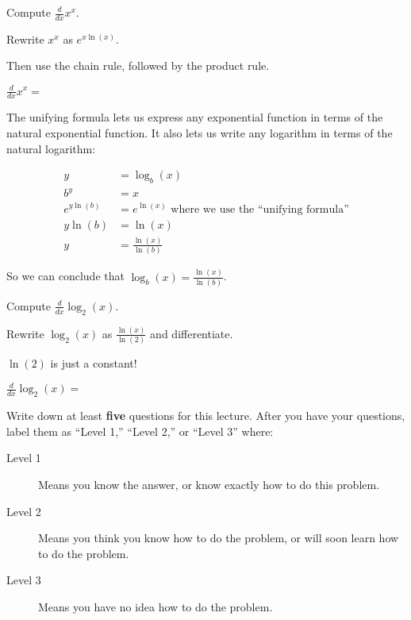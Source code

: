 \documentclass{ximera}
\begin{document}
\begin{question}
  Compute $\frac{d}{dx} x^x$.
  
  \begin{hint}
    Rewrite $x^x$ as $e^{x\ln(x)}$.
  \end{hint}
  \begin{hint}
    Then use the chain rule, followed by the product rule.
  \end{hint}
  $\frac{d}{dx} x^x = $ 
\end{question}

The unifying formula lets us express any exponential function in terms of the natural exponential function.  It also lets us write any logarithm in terms of the natural logarithm:

\begin{align*}
	y &= \log_b(x)\\
	b^y &=  x\\
	e^{y\ln(b)} &= e^{\ln(x)} \text{ where we use the ``unifying formula''}\\
	y\ln(b) &= \ln(x)\\
	y &= \frac{\ln(x)}{\ln(b)}
\end{align*}

So we can conclude that $\log_b(x) = \frac{\ln(x)}{\ln(b)}$.

\begin{question}
	Compute $\frac{d}{dx} \log_2(x)$.
	\begin{hint}
	  Rewrite $\log_2(x)$ as $\frac{\ln(x)}{\ln(2)}$ and differentiate.
	\end{hint}
	\begin{hint}
	  $\ln(2)$ is just a constant!
	\end{hint}
	$\frac{d}{dx} \log_2(x)=$
\end{question}


\begin{question}

Write down at least \textbf{five} questions for this lecture. After
you have your questions, label them as ``Level 1,'' ``Level 2,'' or ``Level 3'' where:
\begin{description}
\item[Level 1] Means you know the answer, or know exactly how to do this problem.
\item[Level 2] Means you think you know how to do the problem, or will soon learn how to do the problem.
\item[Level 3] Means you have no idea how to do the problem. 
\end{description}
  \begin{freeResponse}
  \end{freeResponse}
\end{question}
\end{document}
